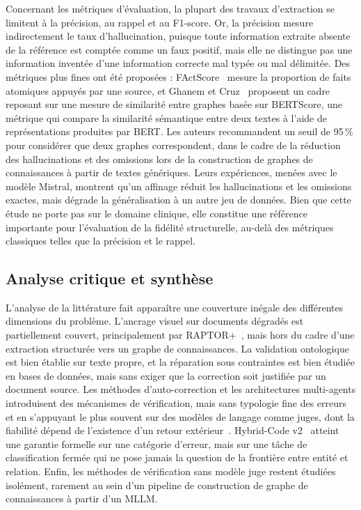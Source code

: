 Concernant les métriques d'évaluation, la plupart des travaux d'extraction se limitent à la précision, au rappel et au F1-score. Or, la précision mesure indirectement le taux d'hallucination, puisque toute information extraite absente de la référence est comptée comme un faux positif, mais elle ne distingue pas une information inventée d'une information correcte mal typée ou mal délimitée. Des métriques plus fines ont été proposées : FActScore~\cite{min2023factscore} mesure la proportion de faits atomiques appuyés par une source, et Ghanem et Cruz~\cite{ghanem2024enhancing} proposent un cadre reposant sur une mesure de similarité entre graphes basée sur BERTScore, une métrique qui compare la similarité sémantique entre deux textes à l'aide de représentations produites par BERT. Les auteurs recommandent un seuil de 95\,\% pour considérer que deux graphes correspondent, dans le cadre de la réduction des hallucinations et des omissions lors de la construction de graphes de connaissances à partir de textes génériques. Leurs expériences, menées avec le modèle Mistral, montrent qu'un affinage réduit les hallucinations et les omissions exactes, mais dégrade la généralisation à un autre jeu de données. Bien que cette étude ne porte pas sur le domaine clinique, elle constitue une référence importante pour l'évaluation de la fidélité structurelle, au-delà des métriques classiques telles que la précision et le rappel.

\subsection{Analyse critique et synthèse}

L'analyse de la littérature fait apparaître une couverture inégale des différentes dimensions du problème. L'ancrage visuel sur documents dégradés est partiellement couvert, principalement par RAPTOR+~\cite{raptorplus2026}, mais hors du cadre d'une extraction structurée vers un graphe de connaissances. La validation ontologique est bien établie sur texte propre, et la réparation sous contraintes est bien étudiée en bases de données, mais sans exiger que la correction soit justifiée par un document source. Les méthodes d'auto-correction et les architectures multi-agents introduisent des mécanismes de vérification, mais sans typologie fine des erreurs et en s'appuyant le plus souvent sur des modèles de langage comme juges, dont la fiabilité dépend de l'existence d'un retour extérieur~\cite{kamoi2024selfcorrection}. Hybrid-Code v2~\cite{hybrid2512v2} atteint une garantie formelle sur une catégorie d'erreur, mais sur une tâche de classification fermée qui ne pose jamais la question de la frontière entre entité et relation. Enfin, les méthodes de vérification sans modèle juge restent étudiées isolément, rarement au sein d'un pipeline de construction de graphe de connaissances à partir d'un MLLM.

